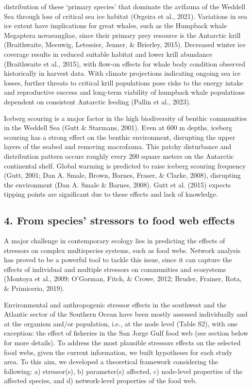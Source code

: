 \documentclass[
]{article}
\begin{document}
distribution of these `primary species' that dominate the avifauna of
the Weddell Sea through loss of critical sea ice habitat (Orgeira et
al., 2021). Variations in sea ice extent have implications for great
whales, such as the Humpback whale Megaptera novaeangliae, since their
primary prey resource is the Antarctic krill (Braithwaite, Meeuwig,
Letessier, Jenner, \& Brierley, 2015). Decreased winter ice coverage
results in reduced suitable habitat and lower krill abundance
(Braithwaite et al., 2015), with flow-on effects for whale body
condition observed historically in harvest data. With climate
projections indicating ongoing sea ice losses, further threats to
critical krill populations pose risks to the energy intake and
reproductive success and long-term viability of humpback whale
populations dependent on consistent Antarctic feeding (Pallin et al.,
2023).

Iceberg scouring is a major factor in the high biodiversity of benthic
communities in the Weddell Sea (Gutt \& Starmans, 2001). Even at 600 m
depths, iceberg scouring has a strong effect on the benthic environment,
disrupting the upper layers of the seabed and removing macrofauna. This
patchy disturbance and distribution pattern occurs roughly every 200
square meters on the Antarctic continental shelf. Global warming is
predicted to raise iceberg scouring frequency (Gutt, 2001; Dan A. Smale,
Brown, Barnes, Fraser, \& Clarke, 2008), disrupting the environment (Dan
A. Smale \& Barnes, 2008). Gutt et al. (2015) expects tipping points are
significant due to these effects and lack of knowledge.

\subsection{4. From species' stressors to food web
effects}\label{from-species-stressors-to-food-web-effects}

A major challenge in contemporary ecology lies in predicting the effects
of stressors on complex multispecies systems, such as food webs. Network
analysis has proved to be a powerful tool to tackle this issue, since it
can capture the effects of individual and multiple stressors on
communities and ecosystems (Montoya et al., 2009; O'Gorman, Fitch, \&
Crowe, 2012; Bruder, Frainer, Rota, \& Primicerio, 2019).

Environmental and anthropogenic stressor effects in the southwest and
the Atlantic sector of the Southern Ocean have been mostly assessed
individually and at the organism and/or population, i.e., at the node
level (Table S2), with one exception: the effect of fisheries in the San
Jorge Gulf food web (see section below for more details). To address the
most plausible stressors effects on the selected food webs, given the
current information, we built hypotheses for each study area. To this
aim, we developed a theoretical framework considering the following: a)
stressor(s), b) parameter(s) affected, c) node-level properties of the
affected species, and d) network-level properties of the food web.
\end{document}
